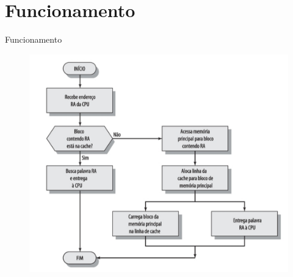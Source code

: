\documentclass[aspectratio=169,
				xcolor=table]{beamer}
\begin{document}
	\section{Funcionamento}

	\begin{frame}{Funcionamento}
		\begin{figure}[hbtp]
			\centering
			\includegraphics[height=0.8\textheight, keepaspectratio]{../figs/cap06/cacheFunc.png}
		\end{figure}
	\end{frame}

%		
%
%
\end{document}
